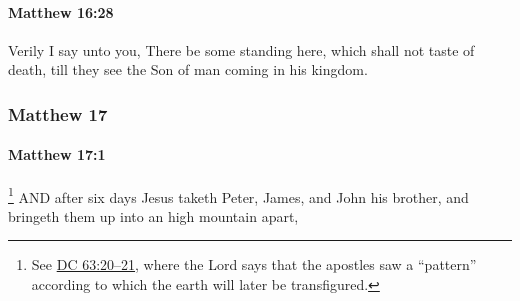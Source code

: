 		\paragraph{Matthew 16:28} %
			\label{MATTHEW-16-28}

			Verily I say unto you, There be some standing here, which shall not taste of death, till they see the Son of man coming in his kingdom.

			\begin{framed}
			\scriptsize
				\begin{compactdesc}
					\item[SBLG] 
				\end{compactdesc}
			\end{framed}

	\subsubsection{Matthew 17} %
		\label{MATTHEW-17}
		
		\paragraph{Matthew 17:1} %
			\label{MATTHEW-17-1}

				\footnote{%
					See \hyperref[DC63-20]{DC 63:20--21}, where the Lord says that the apostles saw a ``pattern'' according to which the earth will later be transfigured.
					}%
			AND after six days Jesus taketh Peter, James, and John his brother, and bringeth them up into an high mountain apart,

